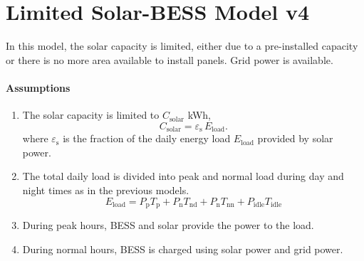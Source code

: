 \section{Limited Solar-BESS Model v4}
In this model, the solar capacity is limited, either due to a pre-installed capacity
or there is no more area available to install panels. Grid power is available.

\paragraph{Assumptions}
\begin{enumerate}
    \item The solar capacity is limited to $C_{\text{solar}}$ kWh, 
    \begin{equation}
        C_{\text{solar}} = \varepsilon_{\text{s}} \, E_{\text{load}}. 
    \end{equation}
    where $\varepsilon_{\text{s}}$ is the fraction of the daily energy load
    $E_{\text{load}}$ provided by solar power. 

    \item The total daily load is divided into peak and normal load during day and night
    times as in the previous models.
    \begin{equation}
    E_{\text{load}}  = P_{\text{p}} T_{\text{p}} 
    + P_{\text{n}} T_{\text{nd}} + P_\text{n} T_\text{nn} 
    + P_\text{idle} T_\text{idle}
    \end{equation}

 
    \item During peak hours, BESS and solar provide the power to the load.
    \item During normal hours, BESS is charged using solar power and grid power.
    
\end{enumerate}

